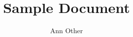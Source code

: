 \documentclass{book}
\title{Sample Document}
\author{Ann Other}
\begin{document}
\maketitle
\tableofcontents



\printunsrtglossaries
\end{document}
